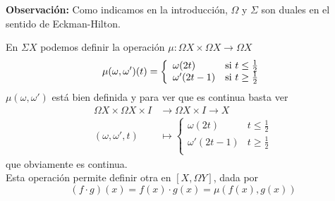 \textbf{Observación:} Como indicamos en la introducción, $\Omega$ y $\Sigma$ son duales en el sentido de Eckman-Hilton. \par

En $\Sigma X$ podemos definir la operación  $\mu : \Omega X \times \Omega X \longrightarrow \Omega X$
\[
\mu(\omega, \omega')(t) = 
\left\{ \begin{array}{ll}
             \omega(2t)		&   $si $ t \leq \frac{1}{2} \\
             \omega'(2t-1)	&   $si $ t \geq \frac{1}{2} \\
        \end{array}
\right.
\]
$\mu(\omega, \omega')$ está bien definida y para ver que es continua basta ver
\begin{align*}
\Omega X \times \Omega X \times I &\longrightarrow \Omega X \times I \longrightarrow X \\
(\omega, \omega', t) &\longmapsto 
\left\{ \begin{array}{ll}
             \omega(2t)		&  t \leq \frac{1}{2} \\
             \omega'(2t-1)	&  t \geq \frac{1}{2} \\
        \end{array}
\right.
\end{align*}
que obviamente es continua. \\
Esta operación permite definir otra en $[X, \Omega Y]$, dada por 
\[ (f \cdotp g)(x) = f(x) \cdotp g(x) = \mu(f(x), g(x)) \]

